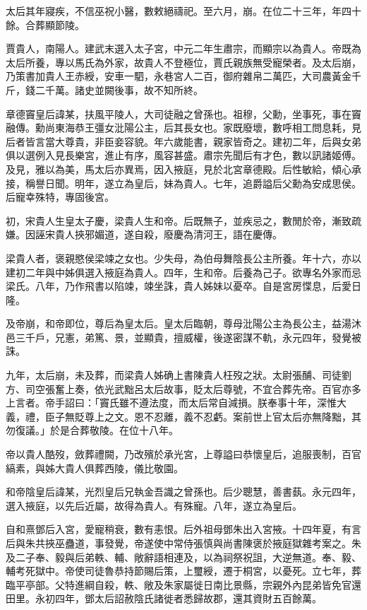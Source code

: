 \begin{pinyinscope}
太后其年寢疾，不信巫祝小醫，數敕絕禱祀。至六月，崩。在位二十三年，年四十餘。合葬顯節陵。

賈貴人，南陽人。建武末選入太子宮，中元二年生肅宗，而顯宗以為貴人。帝既為太后所養，專以馬氏為外家，故貴人不登極位，賈氏親族無受寵榮者。及太后崩，乃策書加貴人王赤綬，安車一駟，永巷宮人二百，御府雜帛二萬匹，大司農黃金千斤，錢二千萬。諸史並闕後事，故不知所終。

章德竇皇后諱某，扶風平陵人，大司徒融之曾孫也。祖穆，父勳，坐事死，事在竇融傳。勳尚東海恭王彊女沘陽公主，后其長女也。家既廢壞，數呼相工問息耗，見后者皆言當大尊貴，非臣妾容貌。年六歲能書，親家皆奇之。建初二年，后與女弟俱以選例入見長樂宮，進止有序，風容甚盛。肅宗先聞后有才色，數以訊諸姬傅。及見，雅以為美，馬太后亦異焉，因入掖庭，見於北宮章德殿。后性敏給，傾心承接，稱譽日聞。明年，遂立為皇后，妹為貴人。七年，追爵謚后父勳為安成思侯。后寵幸殊特，專固後宮。

初，宋貴人生皇太子慶，梁貴人生和帝。后既無子，並疾忌之，數閒於帝，漸致疏嫌。因誣宋貴人挾邪媚道，遂自殺，廢慶為清河王，語在慶傳。

梁貴人者，褒親愍侯梁竦之女也。少失母，為伯母舞陰長公主所養。年十六，亦以建初二年與中姊俱選入掖庭為貴人。四年，生和帝。后養為己子。欲專名外家而忌梁氏。八年，乃作飛書以陷竦，竦坐誅，貴人姊妹以憂卒。自是宮房惵息，后愛日隆。

及帝崩，和帝即位，尊后為皇太后。皇太后臨朝，尊母沘陽公主為長公主，益湯沐邑三千戶，兄憲，弟篤、景，並顯貴，擅威權，後遂密謀不軌，永元四年，發覺被誅。

九年，太后崩，未及葬，而梁貴人姊确上書陳貴人枉歿之狀。太尉張酺、司徒劉方、司空張奮上奏，依光武黜呂太后故事，貶太后尊號，不宜合葬先帝。百官亦多上言者。帝手詔曰：「竇氏雖不遵法度，而太后常自減損。朕奉事十年，深惟大義，禮，臣子無貶尊上之文。恩不忍離，義不忍虧。案前世上官太后亦無降黜，其勿復議。」於是合葬敬陵。在位十八年。

帝以貴人酷歿，斂葬禮闕，乃改殯於承光宮，上尊謚曰恭懷皇后，追服喪制，百官縞素，與姊大貴人俱葬西陵，儀比敬園。

和帝陰皇后諱某，光烈皇后兄執金吾識之曾孫也。后少聰慧，善書蓺。永元四年，選入掖庭，以先后近屬，故得為貴人。有殊寵。八年，遂立為皇后。

自和熹鄧后入宮，愛寵稍衰，數有恚恨。后外祖母鄧朱出入宮掖。十四年夏，有言后與朱共挾巫蠱道，事發覺，帝遂使中常侍張慎與尚書陳褒於掖庭獄雜考案之。朱及二子奉、毅與后弟軼、輔、敞辭語相連及，以為祠祭祝詛，大逆無道。奉、毅、輔考死獄中。帝使司徒魯恭持節賜后策，上璽綬，遷于桐宮，以憂死。立七年，葬臨平亭部。父特進綱自殺，軼、敞及朱家屬徙日南比景縣，宗親外內昆弟皆免官還田里。永初四年，鄧太后詔赦陰氏諸徙者悉歸故郡，還其資財五百餘萬。


\end{pinyinscope}
